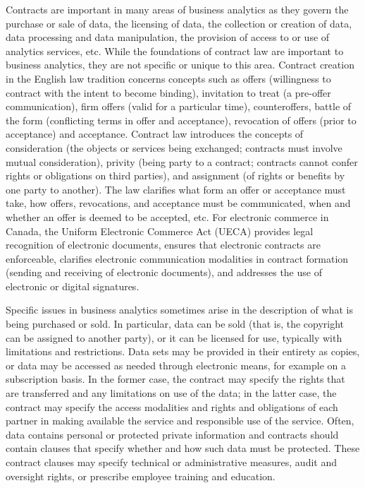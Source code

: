 Contracts are important in many areas of business analytics as they govern the purchase or sale of data, the licensing of data, the collection or creation of data, data processing and data manipulation, the provision of access to or use of analytics services, etc. While the foundations of contract law are important to business analytics, they are not specific or unique to this area. Contract creation in the English law tradition concerns concepts such as offers (willingness to contract with the intent to become binding), invitation to treat (a pre-offer communication), firm offers (valid for a particular time), counteroffers, battle of the form (conflicting terms in offer and acceptance), revocation of offers (prior to acceptance) and acceptance. Contract law introduces the concepts of consideration (the objects or services being exchanged; contracts must involve mutual consideration), privity (being party to a contract; contracts cannot confer rights or obligations on third parties), and assignment (of rights or benefits by one party to another). The law clarifies what form an offer or acceptance must take, how offers, revocations, and acceptance must be communicated, when and whether an offer is deemed to be accepted, etc. For electronic commerce in Canada, the Uniform Electronic Commerce Act (UECA) provides legal recognition of electronic documents, ensures that electronic contracts are enforceable, clarifies electronic communication modalities in contract formation (sending and receiving of electronic documents), and addresses the use of electronic or digital signatures. 


Specific issues in business analytics sometimes arise in the description of what is being purchased or sold. In particular, data can be sold (that is, the copyright can be assigned to another party), or it can be licensed for use, typically with limitations and restrictions. Data sets may be provided in their entirety as copies, or data may be accessed as needed through electronic means, for example on a subscription basis. In the former case, the contract may specify the rights that are transferred and any limitations on use of the data; in the latter case, the contract may specify the access modalities and rights and obligations of each partner in making available the service and responsible use of the service. Often, data contains personal or protected private information and contracts should contain clauses that specify whether and how such data must be protected. These contract clauses may specify technical or administrative measures, audit and oversight rights, or prescribe employee training and education. 

